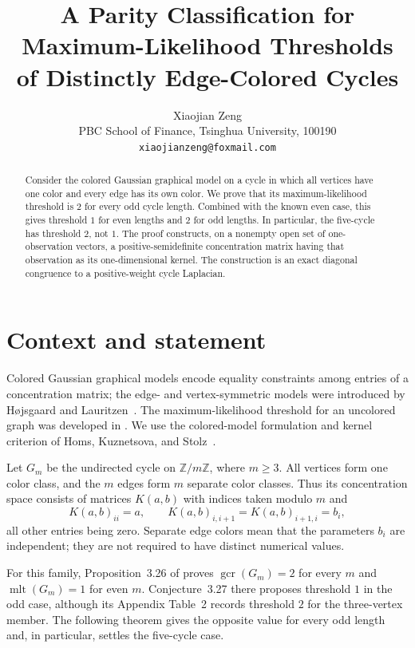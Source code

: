 \documentclass[11pt]{article}
\title{A Parity Classification for Maximum-Likelihood Thresholds\\
of Distinctly Edge-Colored Cycles}
\author{Xiaojian Zeng\\
\small PBC School of Finance, Tsinghua University, 100190\\
\small \texttt{xiaojianzeng@foxmail.com}}
\date{}
\newcommand{\mlt}{\operatorname{mlt}}
\newcommand{\gcr}{\operatorname{gcr}}
\begin{document}
\maketitle

\begin{abstract}
Consider the colored Gaussian graphical model on a cycle in which all
vertices have one color and every edge has its own color.  We prove that its
maximum-likelihood threshold is $2$ for every odd cycle length.  Combined
with the known even case, this gives threshold $1$ for even lengths and $2$
for odd lengths.  In particular, the five-cycle has threshold $2$, not $1$.
The proof constructs, on a nonempty open set of one-observation vectors, a
positive-semidefinite concentration matrix having that observation as its
one-dimensional kernel.  The construction is an exact diagonal congruence
to a positive-weight cycle Laplacian.
\end{abstract}

\section{Context and statement}

Colored Gaussian graphical models encode equality constraints among entries
of a concentration matrix; the edge- and vertex-symmetric models were
introduced by H\o jsgaard and Lauritzen~\cite{HojsgaardLauritzen2008}.  The
maximum-likelihood threshold for an uncolored graph was developed in
\cite{GrossSullivant2018}.  We use the colored-model formulation and kernel
criterion of Homs, Kuznetsova, and Stolz~\cite{HomsKuznetsovaStolz2026}.

Let $G_m$ be the undirected cycle on $\mathbb Z/m\mathbb Z$, where $m\geq3$.
All vertices form one color class, and the $m$ edges form $m$ separate color
classes.  Thus its concentration space consists of matrices $K(a,b)$ with
indices taken modulo $m$ and
\[
 K(a,b)_{ii}=a,\qquad
 K(a,b)_{i,i+1}=K(a,b)_{i+1,i}=b_i,
\]
all other entries being zero.  Separate edge colors mean that the parameters
$b_i$ are independent; they are not required to have distinct numerical
values.

For this family, Proposition~3.26 of
\cite{HomsKuznetsovaStolz2026} proves $\gcr(G_m)=2$ for every $m$ and
$\mlt(G_m)=1$ for even $m$.  Conjecture~3.27 there proposes threshold $1$ in
the odd case, although its Appendix Table~2 records threshold $2$ for the
three-vertex member.  The following theorem gives the opposite value for
every odd length and, in particular, settles the five-cycle case.
\end{document}
